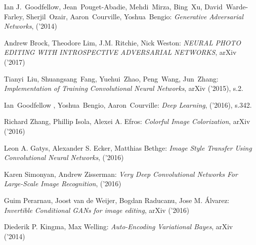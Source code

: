 \begin{thebibliography}{99} %

   Ian J.~Goodfellow, Jean~Pouget-Abadie, Mehdi~Mirza, Bing~Xu, David~Warde-Farley, Sherjil~Ozair, Aaron~Courville, Yoshua~Bengio:
  \emph{Generative Adversarial Networks}, ('2014)

   Andrew Brock, Theodore Lim, J.M. Ritchie,
  Nick Weston:
  \emph{NEURAL PHOTO EDITING WITH INTROSPECTIVE ADVERSARIAL NETWORKS}, arXiv ('2017)

   Tianyi~Liu, Shuangsang~Fang, Yuehui~Zhao, Peng~Wang, Jun~Zhang:
  \emph{Implementation of Training Convolutional Neural Networks}, arXiv ('2015), s.2.

   Ian~Goodfellow ,  Yoshua~Bengio, Aaron~Courville:
  \emph{Deep Learning}, ('2016), s.342.

   Richard Zhang, Phillip Isola, Alexei A. Efros:
  \emph{Colorful Image Colorization}, arXiv ('2016)

   Leon A. Gatys, Alexander S. Ecker, Matthias Bethge:
  \emph{Image Style Transfer Using Convolutional Neural Networks}, ('2016)

   Karen Simonyan, Andrew Zisserman:
  \emph{Very Deep Convolutional Networks For Large-Scale Image Recognition}, ('2016)

   Guim Perarnau, Joost van de Weijer, Bogdan Raducanu, Jose M. Álvarez:
  \emph{Invertible Conditional GANs for image editing}, arXiv ('2016)

   Diederik P. Kingma, Max Welling:
  \emph{Auto-Encoding Variational Bayes}, arXiv ('2014)


\end{thebibliography}
